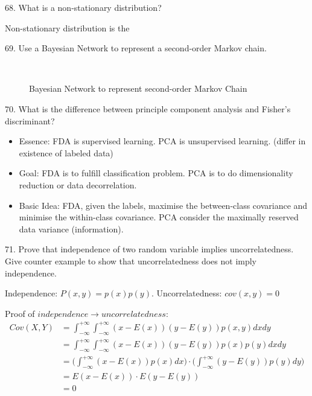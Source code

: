 \documentclass[11pt,a4paper]{article}
\newcommand{\infint}{\int_{-\infty}^{+\infty}}
\begin{document}
68. What is a non-stationary distribution?

    Non-stationary distribution is the 

69. Use a Bayesian Network to represent a second-order Markov chain.

\begin{figure}[H] \centering
{}\\[0.5cm]
\caption{Bayesian Network to represent second-order Markov Chain}
\end{figure}

70. What is the difference between principle component analysis and Fisher's discriminant?

    \begin{itemize}
        \item Essence: FDA is supervised learning. PCA is unsupervised learning. (differ in existence of labeled data)
    \item Goal: FDA is to fulfill classification problem. PCA is to do dimensionality reduction or data decorrelation.
    \item Basic Idea: FDA, given the labels, maximise the between-class covariance and minimise the within-class covariance. PCA consider the maximally reserved data variance (information).
     \end{itemize}

71. Prove that independence of two random variable implies uncorrelatedness. Give counter example to show that uncorrelatedness does not imply independence.

    Independence: $ P (x,y) = p(x) p(y) $.  Uncorrelatedness: $ cov (x,y) = 0 $

    Proof of $independence \rightarrow uncorrelatedness$:
    \begin{align}
        Cov(X,Y) &= \infint \infint (x - E(x))(y - E(y)) p(x,y) dx dy  \\
        &= \infint \infint (x - E(x))(y - E(y))  p(x)p(y) dx dy \\
        &= \big( \infint (x - E(x)) p(x) dx \big) \cdot \big( \infint (y - E(y)) p(y) dy \big) \\
        &=  E(x - E(x)) \cdot E(y - E(y)) \\
        &=  0 
    \end{align}
\end{document}
